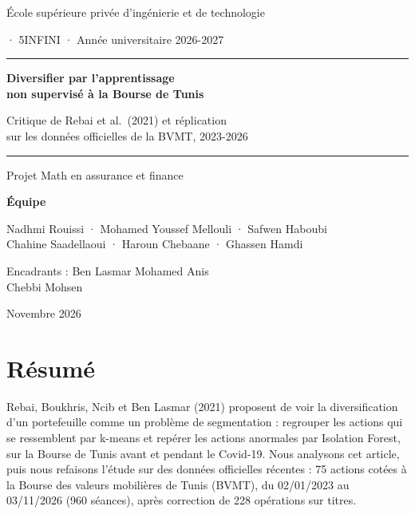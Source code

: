 \documentclass[11pt,a4paper]{article}
\begin{document}
\begin{titlepage}
\centering
{\large École supérieure privée d'ingénierie et de technologie\par}
{\normalsize  · 5INFINI · Année universitaire 2026-2027\par}
\vspace{2.2cm}
{\color{navy}\rule{\linewidth}{1pt}\par\vspace{0.4cm}}
{\Huge\bfseries\color{navy} Diversifier par l'apprentissage\\[4pt] non supervisé à la Bourse de Tunis\par}
\vspace{0.4cm}
{\Large Critique de Rebai et al.\ (2021) et réplication\\ sur les données officielles de la BVMT, 2023-2026\par}
{\color{navy}\rule{\linewidth}{1pt}\par}
\vspace{1.2cm}
{\large Projet Math en assurance et finance\par}
\vspace{1.5cm}
{\large\bfseries Équipe\par}
\vspace{0.2cm}
{\large Nadhmi Rouissi · Mohamed Youssef Mellouli · Safwen Haboubi\\ Chahine Saadellaoui · Haroun Chebaane · Ghassen Hamdi\par}
\vspace{1.2cm}
{\large Encadrants : Ben Lasmar Mohamed Anis \\ Chebbi Mohsen\par}
\vfill
{\large Novembre 2026\par}
\end{titlepage}

\section*{Résumé}
Rebai, Boukhris, Ncib et Ben Lasmar (2021) proposent de voir la diversification d'un portefeuille comme un problème de segmentation : regrouper les actions qui se ressemblent par k-means et repérer les actions anormales par Isolation Forest, sur la Bourse de Tunis avant et pendant le Covid-19. Nous analysons cet article, puis nous refaisons l'étude sur des données officielles récentes : 75 actions cotées à la Bourse des valeurs mobilières de Tunis (BVMT), du 02/01/2023 au 03/11/2026 (960 séances), après correction de 228 opérations sur titres.
\end{document}
